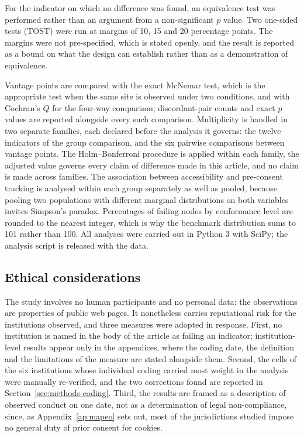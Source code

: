 \documentclass[pdflatex,sn-basic,Numbered,iicol]{sn-jnl}
\theoremstyle{thmstyleone}
\theoremstyle{thmstyletwo}
\theoremstyle{thmstylethree}
\begin{document}
For the indicator on which no difference was found, an equivalence test was performed rather than an argument from a non-significant $p$ value. Two one-sided tests (TOST) were run at margins of 10, 15 and 20 percentage points. The margins were not pre-specified, which is stated openly, and the result is reported as a bound on what the design can establish rather than as a demonstration of equivalence.

Vantage points are compared with the exact McNemar test, which is the appropriate test when the same site is observed under two conditions, and with Cochran's $Q$ for the four-way comparison; discordant-pair counts and exact $p$ values are reported alongside every such comparison. Multiplicity is handled in two separate families, each declared before the analysis it governs: the twelve indicators of the group comparison, and the six pairwise comparisons between vantage points. The Holm--Bonferroni procedure is applied within each family, the adjusted value governs every claim of difference made in this article, and no claim is made across families. The association between accessibility and pre-consent tracking is analysed within each group separately as well as pooled, because pooling two populations with different marginal distributions on both variables invites Simpson's paradox. Percentages of failing nodes by conformance level are rounded to the nearest integer, which is why the benchmark distribution sums to 101 rather than 100. All analyses were carried out in Python 3 with SciPy; the analysis script is released with the data.

\subsection{Ethical considerations}\label{sec:methods-ethics}

The study involves no human participants and no personal data: the observations are properties of public web pages. It nonetheless carries reputational risk for the institutions observed, and three measures were adopted in response. First, no institution is named in the body of the article as failing an indicator; institution-level results appear only in the appendices, where the coding date, the definition and the limitations of the measure are stated alongside them. Second, the cells of the six institutions whose individual coding carried most weight in the analysis were manually re-verified, and the two corrections found are reported in Section~\ref{sec:methods-coding}. Third, the results are framed as a description of observed conduct on one date, not as a determination of legal non-compliance, since, as Appendix~\ref{ap:mapeo} sets out, most of the jurisdictions studied impose no general duty of prior consent for cookies.
\end{document}
